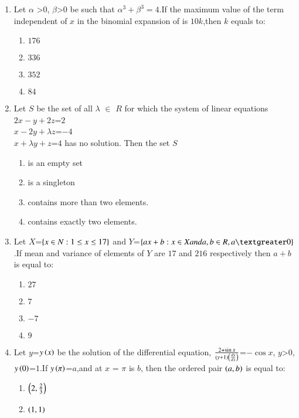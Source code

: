 \documentclass[journal]{IEEEtran}
\begin{document}
\begin{enumerate} [start=16]
    \item Let $\alpha$ \textgreater $0$, $\beta$\textgreater$0$ be such that $\alpha^3+\beta^3=4$.If the maximum value of the term independent of $x$ in the binomial expansion of  is $10k$,then $k$ equals to:
    \begin{enumerate}
        \item $176$
        \item $336$
        \item $352$
        \item $84$
    \end{enumerate}
    \item Let $S$ be the set of all $\lambda$ $\in$ $R$ for which the system of linear equations \\
    $2x-y+2z$=$2$\\
    $x-2y+\lambda z$=$-4$\\
    $x+\lambda y+z$=$4$ has no solution. Then the set $S$
    \begin{enumerate}
        \item is an empty set
        \item is a singleton
        \item contains more than two elements.
        \item contains exactly two elements.
    \end{enumerate}
    \item Let $X$=$\left\{x\in N:1\leq x\leq 17\right\}$ and $Y$=$\cbrak{ax+b:x \in X and a,b \in R,a \textgreater0}$.If mean and variance of elements of $Y$ are $17$ and $216$ respectively then $a+b$ is equal to:
    \begin{enumerate}
        \item $27$
        \item $7$
        \item $-7$
        \item $9$
    \end{enumerate}
    \item Let $y$=$y\left(x\right)$ be the solution of the differential equation, $\frac{2+\sin{x}}{\left(y+1\right)\left(\frac{dy}{dx}\right)}$=$-\cos{x}$, $y$\textgreater $0$,$y\left(0\right)$=$1$.If $y\left(\pi\right)$=$a$,and at $x$ = $\pi$ is $b$, then the ordered pair $\left(a,b\right)$ is equal to:
    \begin{enumerate}
        \item $\left(2,\frac{2}{3}\right)$
        \item $\left(1,1\right)$

\end{enumerate}
\end{enumerate}
\end{document}
